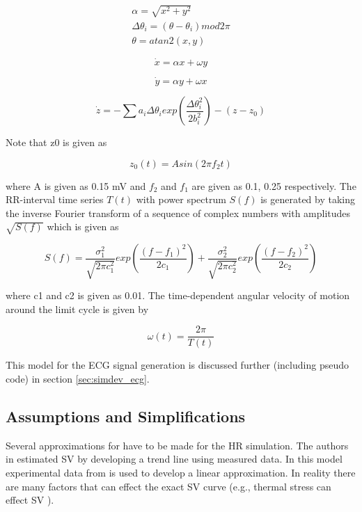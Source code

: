 \documentclass[paper=a4, fontsize=11pt]{scrartcl}
\numberwithin{equation}{section}		%
\numberwithin{figure}{section}			%
\numberwithin{table}{section}		    %
\begin{document}
\begin{equation}\label{eq:ecg1}
\begin{split}
\alpha = \sqrt{x^2 + y^2} \\
\Delta\theta_i = (\theta - \theta_i)mod 2\pi \\
\theta = atan2(x,y)
\end{split}
\end{equation}

\begin{equation}\label{eq:ecg2}
\dot{x}=\alpha x + \omega y
\end{equation}

\begin{equation}\label{eq:ecg3}
\dot{y}=\alpha y + \omega x 
\end{equation}

\begin{equation}\label{eq:ecg4}
\dot{z} = -\sum a_i \Delta\theta_i exp\left(\frac{\Delta\theta_i^2}{2b_i^2}\right) - (z - z_0)
\end{equation}

Note that z0 is given as

\begin{equation}\label{eq:ecg5}
z_0(t) = A sin(2\pi f_2t)
\end{equation}

where A is given as 0.15 mV and $f_2$ and $f_1$ are given as 0.1, 0.25 respectively. The 
RR-interval time series $T(t)$ with power spectrum $S(f)$ is generated by taking the inverse 
Fourier transform of a sequence of complex numbers with amplitudes $\sqrt{S(f)}$ which is 
given as

\begin{equation}\label{eq:ecg6}
S(f) = \frac{\sigma^2_1}{\sqrt{2\pi c^2_1}}exp\left(\frac{(f-f_1)^2}{2c_1}\right) +
       \frac{\sigma^2_2}{\sqrt{2\pi c^2_2}}exp\left(\frac{(f-f_2)^2}{2c_2}\right) 
\end{equation}

where c1 and c2 is given as 0.01. The time-dependent angular velocity of motion around the limit
 cycle is given by

\begin{equation}\label{eq:ecg7}
\omega(t) = \frac{2\pi}{T(t)}
\end{equation}

This model for the ECG signal generation is discussed further (including pseudo code) in 
section \ref{sec:simdev_ecg}. 

\subsection{Assumptions and Simplifications} \label{sec:modle_ass}
Several approximations for have to be made for the HR simulation. The authors in
\cite{hotehama2003simulation} estimated SV by developing a trend line using measured data. In 
this model experimental data from \cite{united1996physical} is used to develop a linear 
approximation. In reality there are many factors that can effect the exact SV curve (e.g.,
thermal stress can effect SV \cite{wilson2011effect}).\\
\end{document}
